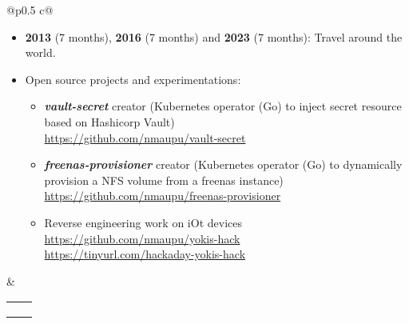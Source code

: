\documentclass[darkhipster]{hipstercv}
\begin{document}
\begin{paracol}{2}
\begin{tabular}[t]{@{}p{} c@{}}
{\begin{minipage}[t]{0.5\textwidth}
    \vspace{1.5em}

    \small
    \begin{itemize}
      \item {\bfseries{2013}} (7 months), {\bfseries{2016}} (7 months) and {\bfseries{2023}} (7 months): Travel around the world.
      \item Open source projects and experimentations:
      \begin{itemize}
        \item \emph{\bfseries{vault-secret}} creator (Kubernetes operator (Go) to inject secret resource based on Hashicorp Vault) \\ {\footnotesize \url{https://github.com/nmaupu/vault-secret}}
        \item \emph{\bfseries{freenas-provisioner}} creator (Kubernetes operator (Go) to dynamically provision a NFS volume from a freenas instance) \\ {\footnotesize \url{https://github.com/nmaupu/freenas-provisioner}}
        \item Reverse engineering work on iOt devices \\ {\footnotesize \url{https://github.com/nmaupu/yokis-hack}} \\ {\footnotesize \url{https://tinyurl.com/hackaday-yokis-hack}}
      \end{itemize}
    \end{itemize}

    \end{minipage}
    } & {
    \begin{minipage}[t]{0.19\textwidth}

      \begin{tabular}[t]{cc}
      \hobbyicon{\color{iconcolour}\faPlane}{Travel}{cvgreen}{\iconsize}{2em} &
      \hobbyicon{\color{iconcolour}\faCamera}{Photo}{cvorange}{\iconsize}{2em} \\
      \hobbyicon{\color{iconcolour}\faWrench}{DIY}{cvpurple}{\iconsize}{2em} &
      \hobbyicon{\color{iconcolour}\faChessPawn}{Chess}{lightgray}{\iconsize}{2em} \\
      \hobbyicon{\color{iconcolour}\faGamepad}{Games}{red}{\iconsize}{2em} &
      \hobbyicon{\color{iconcolour}\faMountain}{Climbing}{cyan}{\iconsize}{2em} \\
      \end{tabular}
    \end{minipage}
    } \\

  \end{tabular}

\end{paracol}





\end{document}
